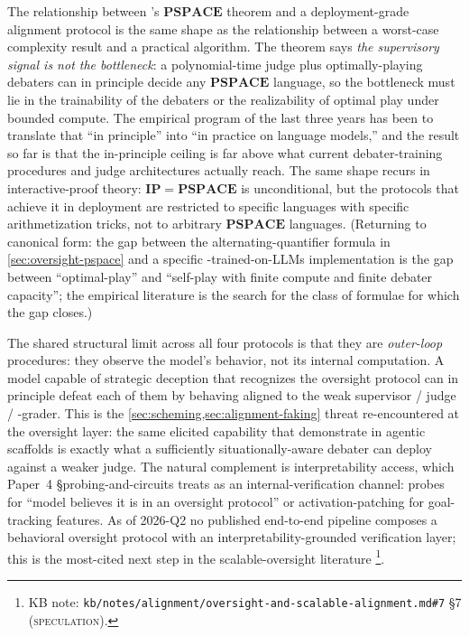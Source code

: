 \begin{intuition}
The relationship between 's $\mathbf{PSPACE}$ theorem and a
deployment-grade alignment protocol is the same shape as the
relationship between a worst-case complexity result and a practical
algorithm. The theorem says \emph{the supervisory signal is not the
bottleneck}: a polynomial-time judge plus optimally-playing debaters
can in principle decide any $\mathbf{PSPACE}$ language, so the
bottleneck must lie in the trainability of the debaters or the
realizability of optimal play under bounded compute. The empirical
program of the last three years has been to translate that ``in
principle'' into ``in practice on language models,'' and the result
so far is that the in-principle ceiling is far above what current
debater-training procedures and judge architectures actually reach.
The same shape recurs in interactive-proof theory: $\mathbf{IP} =
\mathbf{PSPACE}$ is unconditional, but the protocols that achieve it
in deployment are restricted to specific languages with specific
arithmetization tricks, not to arbitrary $\mathbf{PSPACE}$ languages.
(Returning to canonical form: the gap between the alternating-quantifier
formula in \cref{sec:oversight-pspace} and a specific
-trained-on-LLMs implementation is the gap between
``optimal-play'' and ``self-play with finite compute and finite
debater capacity''; the empirical literature is the search for the
class of formulae for which the gap closes.)
\end{intuition}

The shared structural limit across all four protocols is that they
are \emph{outer-loop} procedures: they observe the model's behavior,
not its internal computation. A model capable of strategic deception
that recognizes the oversight protocol can in principle defeat each
of them by behaving aligned to the weak supervisor /  judge /
-grader. This is the
\cref{sec:scheming,sec:alignment-faking} threat re-encountered at the
oversight layer: the same elicited capability that
\citet{meinke2024-apollo-scheming} demonstrate in agentic scaffolds
is exactly what a sufficiently situationally-aware debater can deploy
against a weaker judge. The natural complement is interpretability
access, which Paper~4 \S{}probing-and-circuits treats as an
internal-verification channel: probes for ``model believes it is in
an oversight protocol'' or activation-patching for goal-tracking
features. As of 2026-Q2 no published end-to-end pipeline composes a
behavioral oversight protocol with an interpretability-grounded
verification layer; this is the most-cited next step in the
scalable-oversight literature%
\footnote{KB note: \nolinkurl{kb/notes/alignment/oversight-and-scalable-alignment.md#7}
\S 7 (\textsc{speculation}).}.

